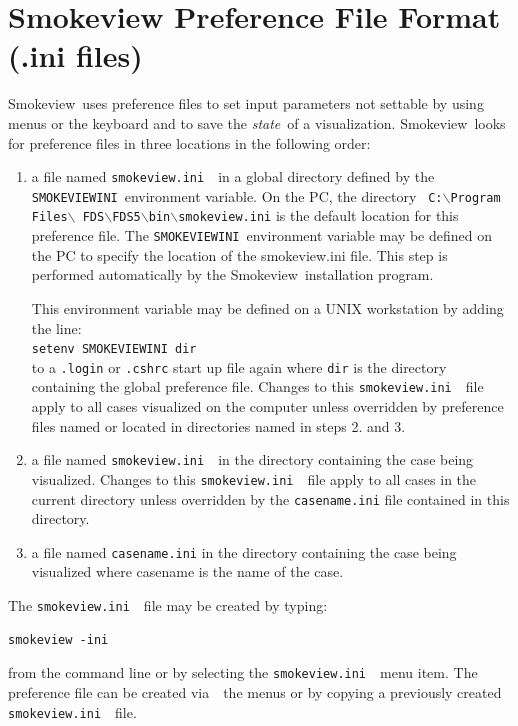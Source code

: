 \documentclass[11pt,twoside]{book}
\newcommand{\svini}{{\tt smokeview.ini}\ }
\newcommand{\Smokeview}{{Smokeview}}
\newcommand{\smokeview}{{Smokeview}}
\newcommand{\via}{{via\ }}
\begin{document}
\section{Smokeview Preference File Format (.ini files)}
\label{sectionconfig}
\label{appendixini}

\Smokeview\ uses preference files to set input parameters not
settable by using menus or the keyboard and to save the {\em state}\
of a visualization. \Smokeview\ looks for preference files in
three locations in the following order:
\begin{enumerate}

\item a file named \svini\ in a global directory
defined by the {\tt SMOKEVIEWINI}\ environment variable. On the PC,
the directory
{\tt
C:$\backslash$Program Files$\backslash$ FDS$\backslash$FDS5$\backslash$bin$\backslash$smokeview.ini} is the
default location for this preference file. The {\tt SMOKEVIEWINI}\
environment variable may be defined on the
PC to specify the location of the smokeview.ini file. This
step is performed automatically by the \smokeview\ installation
program.

This environment variable may be
defined on a UNIX workstation by adding the line:\\

{\tt setenv SMOKEVIEWINI dir} \\

to a {\tt .login}  or {\tt .cshrc} start up file
again where {\tt dir} is the directory containing the
global preference file. Changes to this \svini\
file apply to all cases visualized on the computer unless
overridden by preference files named or located in
directories named in steps 2. and  3.

\item a file named \svini\ in the directory
containing the case being visualized.  Changes to this \svini\ file apply to all cases in the current
directory unless overridden by the {\tt casename.ini} file
contained in this directory.

\item a file named {\tt casename.ini} in the directory containing the case being
visualized where casename is the name of the case.
\end{enumerate}

The \svini\ file may be created by typing:
\begin{verbatim}
smokeview -ini
\end{verbatim}
\noindent from the command line or by selecting the \svini\ menu item. The 
preference file can be created \via\ the menus or by copying a
previously created \svini\ file.
\end{document}
